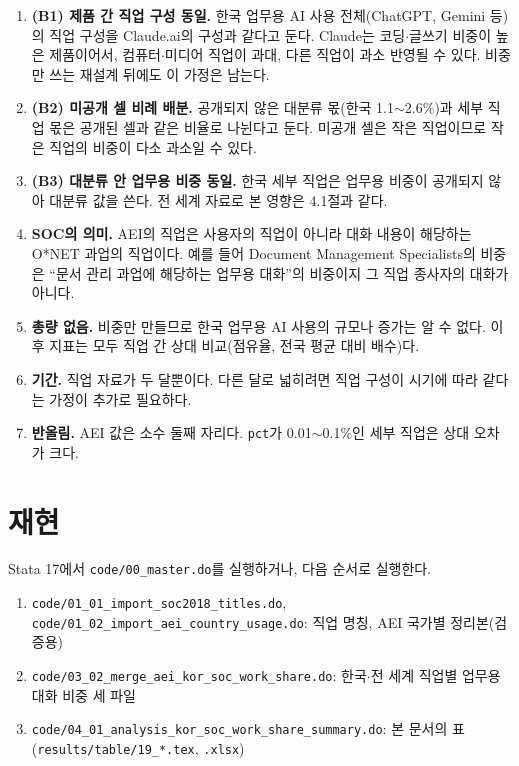 \documentclass[11pt]{article}
\begin{document}
\begin{enumerate}[leftmargin=*]
  \item \textbf{(B1) 제품 간 직업 구성 동일.} 한국 업무용 AI 사용 전체(ChatGPT, Gemini 등)의 직업 구성을 Claude.ai의 구성과 같다고 둔다. Claude는 코딩$\cdot$글쓰기 비중이 높은 제품이어서, 컴퓨터$\cdot$미디어 직업이 과대, 다른 직업이 과소 반영될 수 있다. 비중만 쓰는 재설계 뒤에도 이 가정은 남는다.
  \item \textbf{(B2) 미공개 셀 비례 배분.} 공개되지 않은 대분류 몫(한국 1.1$\sim$2.6\%)과 세부 직업 몫은 공개된 셀과 같은 비율로 나뉜다고 둔다. 미공개 셀은 작은 직업이므로 작은 직업의 비중이 다소 과소일 수 있다.
  \item \textbf{(B3) 대분류 안 업무용 비중 동일.} 한국 세부 직업은 업무용 비중이 공개되지 않아 대분류 값을 쓴다. 전 세계 자료로 본 영향은 4.1절과 같다.
  \item \textbf{SOC의 의미.} AEI의 직업은 사용자의 직업이 아니라 대화 내용이 해당하는 O*NET 과업의 직업이다. 예를 들어 Document Management Specialists의 비중은 ``문서 관리 과업에 해당하는 업무용 대화''의 비중이지 그 직업 종사자의 대화가 아니다.
  \item \textbf{총량 없음.} 비중만 만들므로 한국 업무용 AI 사용의 규모나 증가는 알 수 없다. 이후 지표는 모두 직업 간 상대 비교(점유율, 전국 평균 대비 배수)다.
  \item \textbf{기간.} 직업 자료가 두 달뿐이다. 다른 달로 넓히려면 직업 구성이 시기에 따라 같다는 가정이 추가로 필요하다.
  \item \textbf{반올림.} AEI 값은 소수 둘째 자리다. \texttt{pct}가 0.01$\sim$0.1\%인 세부 직업은 상대 오차가 크다.
\end{enumerate}

\section{재현}

Stata 17에서 \texttt{code/00\_master.do}를 실행하거나, 다음 순서로 실행한다.
\begin{enumerate}[leftmargin=*]
  \item \texttt{code/01\_01\_import\_soc2018\_titles.do}, \texttt{code/01\_02\_import\_aei\_country\_usage.do}: 직업 명칭, AEI 국가별 정리본(검증용)
  \item \texttt{code/03\_02\_merge\_aei\_kor\_soc\_work\_share.do}: 한국$\cdot$전 세계 직업별 업무용 대화 비중 세 파일
  \item \texttt{code/04\_01\_analysis\_kor\_soc\_work\_share\_summary.do}: 본 문서의 표(\texttt{results/table/19\_*.tex}, \texttt{.xlsx})
\end{enumerate}

\printbibliography[title={참고문헌}]
\end{document}
